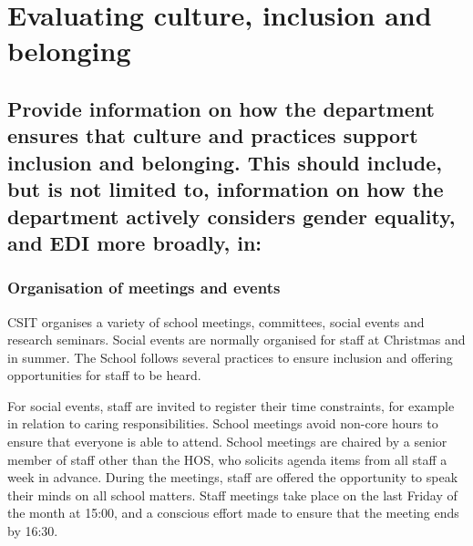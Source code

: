 
\clearpage

\section{Evaluating culture, inclusion and belonging}
\label{sec:culture}

\subsection{Provide information on how the department ensures that culture and practices support inclusion and belonging. This should include, but is not limited to, information on how the department actively considers gender equality, and EDI more broadly, in:} 

\subsubsection{Organisation of meetings and events}\label{sec:events}
CSIT organises a variety of school meetings, committees, social events and research seminars.  
Social events are normally organised for staff at Christmas and in summer. The School follows several practices to ensure inclusion and offering opportunities for staff to be heard. 

For social events, staff are invited to register their time constraints, for example in relation to caring responsibilities. 
School meetings avoid non-core hours to ensure that everyone is able to attend.%
School meetings are chaired by a senior member of staff other than the \ac{HOS}, who solicits agenda items from all staff a week in advance. 
During the meetings, staff are offered the opportunity to speak their minds on all school matters.
Staff meetings take place on the last Friday of the month at 15:00, and a conscious effort made to ensure that the meeting ends by 16:30. 

